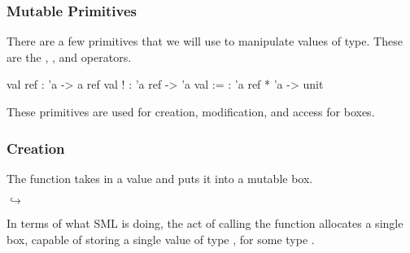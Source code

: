 \documentclass[aspectratio=169]{beamer}
\begin{document}
\begin{frame}[fragile]
  \frametitle{Mutable Primitives}

  There are a few primitives that we will use to manipulate values of 
  type. These are the , \code{!}, and \code{:=} operators.

  \pause
  \vspace{\fill}

  \begin{codeblock}
    val ref : 'a -> a ref
    val !   : 'a ref -> 'a
    val :=  : 'a ref * 'a -> unit
  \end{codeblock}

  \pause
  \vspace{\fill}

  These primitives are used for creation, modification, and access for 
  boxes.
\end{frame}

\begin{frame}[fragile]
  \frametitle{ Creation}

  The  function takes in a value and puts it into a mutable box.

  \pause
  \vspace{\fill}

  \begin{center}
    \begin{minipage}{0.15\textwidth}
      \centering
    \end{minipage}
    \pause
    \begin{minipage}{0.1\textwidth}
      \centering
      $\hookrightarrow$
    \end{minipage}
    \begin{minipage}{0.15\textwidth}
      \centering
    \end{minipage}
  \end{center}

  \pause
  \vspace{\fill}


  \pause
  \vspace{\fill}

  In terms of what SML is doing, the act of calling the  function
  allocates a single box, capable of storing a single value of type ,
  for some type .

  \pause
  \vspace{\fill}

\end{frame}
\end{document}
